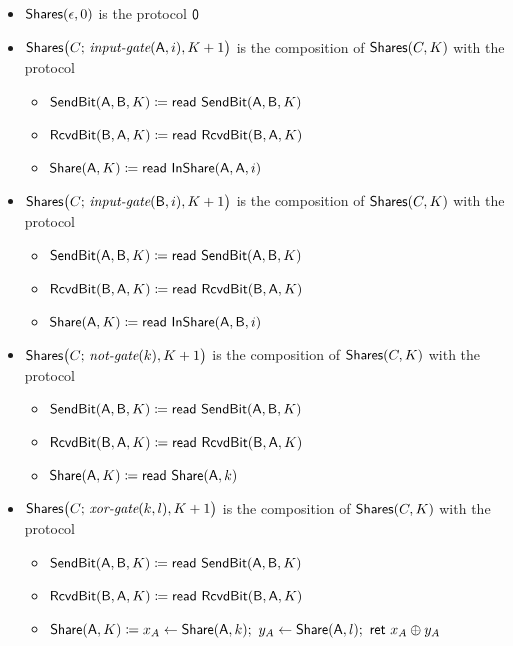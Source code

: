 \begin{itemize}
\item $\Shares(\epsilon,0)$ is the protocol $\zero$

\item $\Shares\big(C; \, \inputgate(\A,i),K+1\big)$ is the composition of $\Shares(C,K)$ with the protocol
\begin{itemize}
\item $\SendBit(\A,\B,K) \coloneqq \read{\SendBit(\A,\B,K)}$
\item $\RcvdBit(\B,\A,K) \coloneqq \read{\RcvdBit(\B,\A,K)}$
\item $\Share(\A,K) \coloneqq \read{\InShare(\A,\A,i)}$
\end{itemize}

\item $\Shares\big(C; \, \inputgate(\B,i),K+1\big)$ is the composition of $\Shares(C,K)$ with the protocol
\begin{itemize}
\item $\SendBit(\A,\B,K) \coloneqq \read{\SendBit(\A,\B,K)}$
\item $\RcvdBit(\B,\A,K) \coloneqq \read{\RcvdBit(\B,\A,K)}$
\item $\Share(\A,K) \coloneqq \read{\InShare(\A,\B,i)}$
\end{itemize}

\item $\Shares\big(C; \, \notgate(k),K+1\big)$ is the composition of $\Shares(C,K)$ with the protocol
\begin{itemize}
\item $\SendBit(\A,\B,K) \coloneqq \read{\SendBit(\A,\B,K)}$
\item $\RcvdBit(\B,\A,K) \coloneqq \read{\RcvdBit(\B,\A,K)}$
\item $\Share(\A,K) \coloneqq \read{\Share(\A,k)}$
\end{itemize}

\item $\Shares\big(C; \, \xorgate(k,l),K+1\big)$ is the composition of $\Shares(C,K)$ with the protocol
\begin{itemize}
\item $\SendBit(\A,\B,K) \coloneqq \read{\SendBit(\A,\B,K)}$
\item $\RcvdBit(\B,\A,K) \coloneqq \read{\RcvdBit(\B,\A,K)}$
\item $\Share(\A,K) \coloneqq x_A \leftarrow \Share(\A,k); \ y_A \leftarrow \Share(\A,l); \ \ret{x_A \oplus y_A}$
\end{itemize}


\end{itemize}
